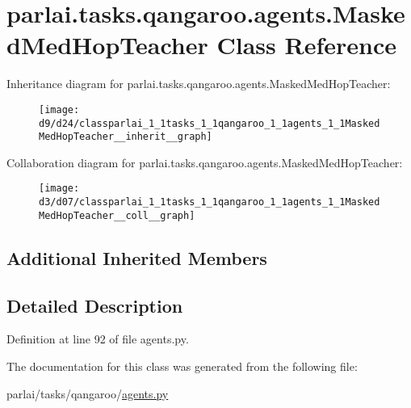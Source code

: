 \hypertarget{classparlai_1_1tasks_1_1qangaroo_1_1agents_1_1MaskedMedHopTeacher}{}\section{parlai.\+tasks.\+qangaroo.\+agents.\+Masked\+Med\+Hop\+Teacher Class Reference}
\label{classparlai_1_1tasks_1_1qangaroo_1_1agents_1_1MaskedMedHopTeacher}


Inheritance diagram for parlai.\+tasks.\+qangaroo.\+agents.\+Masked\+Med\+Hop\+Teacher\+:\nopagebreak
\begin{figure}[H]
\begin{center}
\leavevmode
\texttt{[image: d9/d24/classparlai\_1\_1tasks\_1\_1qangaroo\_1\_1agents\_1\_1MaskedMedHopTeacher\_\_inherit\_\_graph]}
\end{center}
\end{figure}


Collaboration diagram for parlai.\+tasks.\+qangaroo.\+agents.\+Masked\+Med\+Hop\+Teacher\+:\nopagebreak
\begin{figure}[H]
\begin{center}
\leavevmode
\texttt{[image: d3/d07/classparlai\_1\_1tasks\_1\_1qangaroo\_1\_1agents\_1\_1MaskedMedHopTeacher\_\_coll\_\_graph]}
\end{center}
\end{figure}
\subsection*{Additional Inherited Members}


\subsection{Detailed Description}


Definition at line 92 of file agents.\+py.



The documentation for this class was generated from the following file\+:\begin{DoxyCompactItemize}
\item 
parlai/tasks/qangaroo/\hyperlink{parlai_2tasks_2qangaroo_2agents_8py}{agents.\+py}\end{DoxyCompactItemize}
